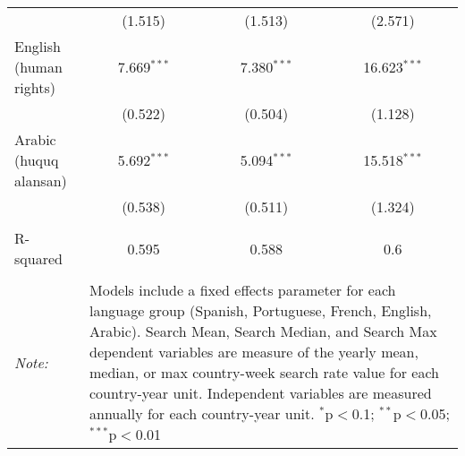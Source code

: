 \begin{table}[!htbp]
\begin{tabular}{@{\extracolsep{5pt}}lccc}
  & (1.515) & (1.513) & (2.571) \\ 
  English (human rights) & 7.669$^{***}$ & 7.380$^{***}$ & 16.623$^{***}$ \\ 
  & (0.522) & (0.504) & (1.128) \\ 
  Arabic (huquq alansan) & 5.692$^{***}$ & 5.094$^{***}$ & 15.518$^{***}$ \\ 
  & (0.538) & (0.511) & (1.324) \\ 
 \hline \\[-1.8ex] 
R-squared  & 0.595 & 0.588 & 0.6 \\ 
\hline 
\hline \\[-1.8ex] 
\textit{Note:}  & \multicolumn{3}{l}{\parbox[t]{8cm}{Models include a fixed effects parameter for each language group (Spanish, Portuguese, French, English, Arabic). Search Mean, Search Median, and Search Max dependent variables are measure of the yearly mean, median, or max country-week search rate value for each country-year unit. Independent variables are measured annually for each country-year unit. $^{*}$p$<$0.1; $^{**}$p$<$0.05; $^{***}$p$<$0.01}} \\ 
\end{tabular} 
\end{table} 
